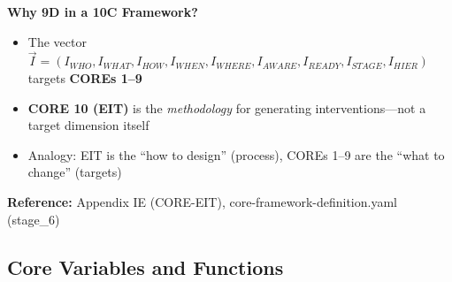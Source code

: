 \begin{tcolorbox}[colback=yellow!5!white, colframe=yellow!75!black,
    title=\textbf{IMPORTANT: Symbol Disambiguation}]
\textbf{Why 9D in a 10C Framework?}
\begin{itemize}[nosep]
    \item The vector $\vec{I} = (I_{WHO}, I_{WHAT}, I_{HOW}, I_{WHEN}, I_{WHERE}, I_{AWARE}, I_{READY}, I_{STAGE}, I_{HIER})$ targets \textbf{COREs 1--9}
    \item \textbf{CORE 10 (EIT)} is the \textit{methodology} for generating interventions---not a target dimension itself
    \item Analogy: EIT is the ``how to design'' (process), COREs 1--9 are the ``what to change'' (targets)
\end{itemize}

\textbf{Reference:} Appendix IE (CORE-EIT), core-framework-definition.yaml (stage\_6)

\end{tcolorbox}

\subsection{Core Variables and Functions}

